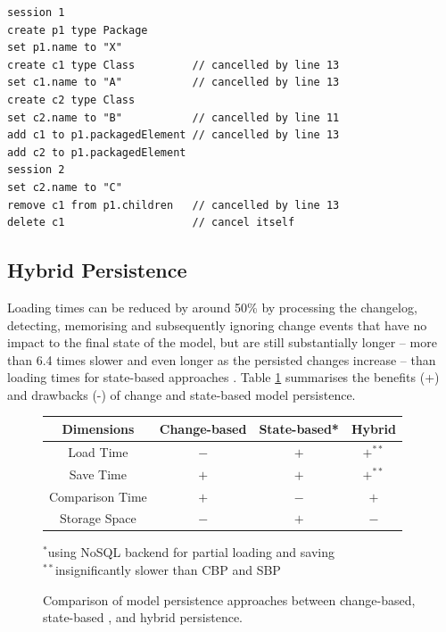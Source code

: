 \documentclass[sigplan,review,anonymous]{acmart}\settopmatter{printfolios=true,printccs=false,printacmref=false}
\begin{document}
\begin{lstlisting}[style=eol,caption={The optimised version of the CBP in List. \ref{lst:cbpmodel}.},label=lst:cbpmodel_optimised]
session 1
create p1 type Package
set p1.name to "X" 
create c1 type Class         // cancelled by line 13
set c1.name to "A"           // cancelled by line 13
create c2 type Class
set c2.name to "B"           // cancelled by line 11
add c1 to p1.packagedElement // cancelled by line 13
add c2 to p1.packagedElement
session 2
set c2.name to "C"
remove c1 from p1.children   // cancelled by line 13  
delete c1                    // cancel itself
\end{lstlisting}



\subsection{Hybrid Persistence}
\label{sec:hybrid_model_persistence}
 Loading times can be reduced by around 50\% by processing the changelog, detecting, memorising and subsequently ignoring change events that have no impact to the final state of the model, but are still substantially longer -- more than 6.4 times slower and even longer as the persisted changes increase -- than loading times for state-based approaches \cite{yohannis2018towards}. Table \ref{table:persistence_comparsion} summarises the benefits (+) and drawbacks (-) of change and state-based model persistence.

\begin{figure}[ht]
    \begin{small}
        \caption{Comparison of model persistence approaches between change-based, state-based 
           , and hybrid persistence.}
        \label{table:persistence_comparsion}
        \begin{tabular}{ c c c c }
            \hline 
            \textbf{Dimensions} & \textbf{Change-based} & \textbf{State-based*} & \textbf{Hybrid} \\ 
            \hline 
            Load Time & $-$ & $+$ & $+^{**}$ \\
            Save Time & $+$ & $+$ & $+^{**}$ \\
            Comparison Time & $+$ & $-$ & $+$ \\
            Storage Space & $-$ & $+$ & $-$ \\
            \hline 
        \end{tabular}
        $^*$using NoSQL backend for partial loading and saving\\$^{**}$insignificantly slower than CBP and SBP
    \end{small}
\end{figure}
\end{document}
